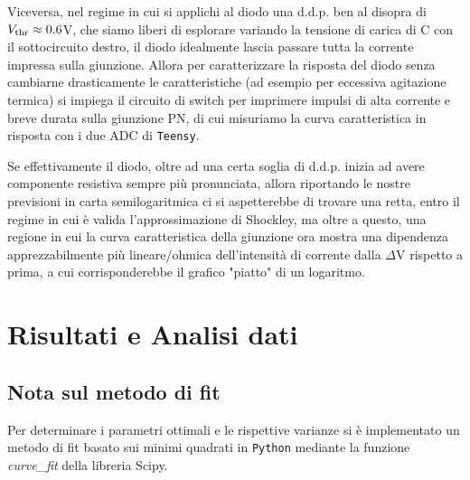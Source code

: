 \documentclass{article}[a4paper, oneside, 11pt]
\begin{document}
Viceversa, nel regime in cui si applichi al diodo una d.d.p. ben al disopra di
$V_{\rm thr} \approx 0.6 $V, che siamo liberi di esplorare variando la tensione
di carica di C con il sottocircuito destro, il diodo idealmente lascia passare
tutta la corrente impressa sulla giunzione. Allora per caratterizzare la
risposta del diodo senza cambiarne drasticamente le caratteristiche (ad esempio
per eccessiva agitazione termica) si impiega il circuito di switch per
imprimere impulsi di alta corrente e breve durata sulla giunzione PN, di cui
misuriamo la curva caratteristica in risposta con i due ADC di \verb+Teensy+. 

Se effettivamente il diodo, oltre ad una certa soglia di d.d.p. inizia ad avere
componente resistiva sempre più pronunciata, allora riportando le nostre
previsioni in carta semilogaritmica ci si aspetterebbe di trovare una retta,
entro il regime in cui è valida l'approssimazione di Shockley, ma oltre a
questo, una regione in cui la curva caratteristica della giunzione ora mostra
una dipendenza apprezzabilmente più lineare/ohmica dell'intensità di corrente
dalla $\Delta$V rispetto a prima, a cui corrisponderebbe il grafico "piatto"
di un logaritmo.  \section{Risultati e Analisi dati}
\subsection{Nota sul metodo di fit}
Per determinare i parametri ottimali e le rispettive varianze si \`e
implementato un metodo di fit basato sui minimi quadrati in \verb+Python+
mediante la funzione \emph{curve\_fit} della libreria Scipy\cite{scipy}.
\medskip


\end{document}
